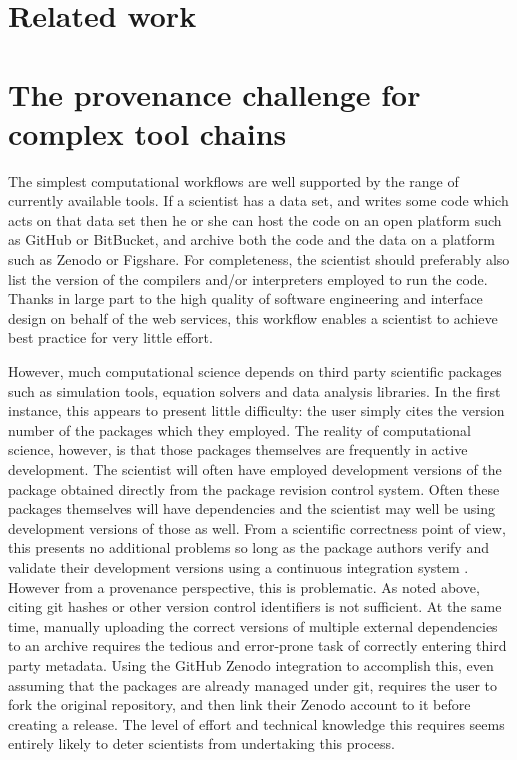 \documentclass[a4paper,11pt]{article}
\begin{document}
\section{Related work}


\section{The provenance challenge for complex tool chains}

The simplest computational workflows are well supported by the range of
currently available tools. If a scientist has a data set, and writes some
code which acts on that data set then he or she can host the code on an open
platform such as GitHub or BitBucket, and archive both the code and the data
on a platform such as Zenodo or Figshare. For completeness, the scientist
should preferably also list the version of the compilers and/or interpreters
employed to run the code. Thanks in large part to the high quality of
software engineering and interface design on behalf of the web services,
this workflow enables a scientist to achieve best practice for very little
effort. 

However, much computational science depends on third party scientific
packages such as simulation tools, equation solvers and data analysis
libraries. In the first instance, this appears to present little difficulty:
the user simply cites the version number of the packages which they
employed. The reality of computational science, however, is that those
packages themselves are frequently in active development. The scientist will
often have employed development versions of the package obtained directly
from the package revision control system. Often these packages themselves
will have dependencies and the scientist may well be using development
versions of those as well. From a scientific correctness point of view, this
presents no additional problems so long as the package authors verify and
validate their development versions using a continuous integration
system \parencite[see, for example][]{Farrell2010}. However from a
provenance perspective, this is problematic. As noted above, citing git
hashes or other version control identifiers is not sufficient. At the same
time, manually uploading the correct versions of multiple external
dependencies to an archive requires the tedious and error-prone task of
correctly entering third party metadata. Using the GitHub Zenodo integration to
accomplish this, even assuming that the packages are already managed under
git, requires the user to fork the original repository, and then link their
Zenodo account to it before creating a release. The level of effort and
technical knowledge this requires seems entirely likely to deter scientists
from undertaking this process.
\end{document}

